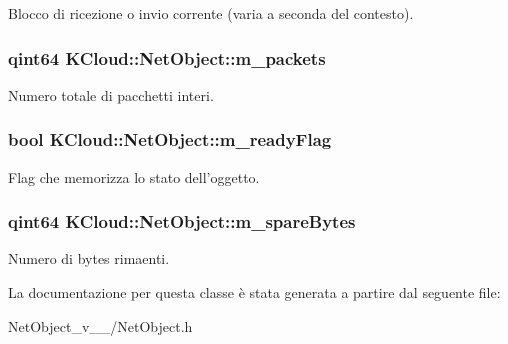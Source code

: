 Blocco di ricezione o invio corrente (varia a seconda del contesto). \hypertarget{class_k_cloud_1_1_net_object_a576585f2e698bc41dc0493e7f85b8a62}{
\subsubsection[{m\-\_\-packets}]{\setlength{\rightskip}{0pt plus 5cm}qint64 K\-Cloud\-::\-Net\-Object\-::m\-\_\-packets\hspace{0.3cm}{\ttfamily [protected]}}}\label{class_k_cloud_1_1_net_object_a576585f2e698bc41dc0493e7f85b8a62}
Numero totale di pacchetti interi. \hypertarget{class_k_cloud_1_1_net_object_ad288fce4a739cd7af358d0b0d35acc32}{
\subsubsection[{m\-\_\-ready\-Flag}]{\setlength{\rightskip}{0pt plus 5cm}bool K\-Cloud\-::\-Net\-Object\-::m\-\_\-ready\-Flag\hspace{0.3cm}{\ttfamily [protected]}}}\label{class_k_cloud_1_1_net_object_ad288fce4a739cd7af358d0b0d35acc32}
Flag che memorizza lo stato dell'oggetto. \hypertarget{class_k_cloud_1_1_net_object_aa3b36c0a1218c00a456aecdee9865d60}{
\subsubsection[{m\-\_\-spare\-Bytes}]{\setlength{\rightskip}{0pt plus 5cm}qint64 K\-Cloud\-::\-Net\-Object\-::m\-\_\-spare\-Bytes\hspace{0.3cm}{\ttfamily [protected]}}}\label{class_k_cloud_1_1_net_object_aa3b36c0a1218c00a456aecdee9865d60}
Numero di bytes rimaenti. 

La documentazione per questa classe è stata generata a partire dal seguente file\-:\begin{DoxyCompactItemize}
\item 
Net\-Object\-\_\-v\-\_\-\_/Net\-Object.\-h\end{DoxyCompactItemize}
